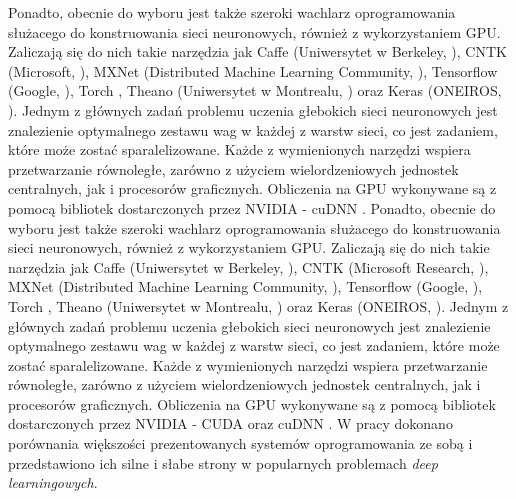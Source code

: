 \documentclass[12pt,a4paper,twoside]{article}
\begin{document}
Ponadto, obecnie do wyboru jest także szeroki wachlarz oprogramowania służacego do konstruowania sieci neuronowych, również z wykorzystaniem GPU. Zaliczają się do nich takie narzędzia jak Caffe (Uniwersytet w Berkeley, \citet{jia2014}), CNTK (Microsoft, \citet{yu2014}), MXNet (Distributed Machine Learning Community, \citet{chen2015}), Tensorflow (Google, \citet{abadi2016}), Torch \citep{collobert2011}, Theano (Uniwersytet w Montrealu, \citet{alrhou2016}) oraz Keras (ONEIROS, \citet{chollet2015}). Jednym z głównych zadań problemu uczenia głebokich sieci neuronowych jest znalezienie optymalnego zestawu wag w każdej z warstw sieci, co jest zadaniem, które może zostać sparalelizowane. Każde z wymienionych narzędzi wspiera przetwarzanie równoległe, zarówno z użyciem wielordzeniowych jednostek centralnych, jak i procesorów graficznych. Obliczenia na GPU wykonywane są z pomocą bibliotek dostarczonych przez NVIDIA - cuDNN \citep{chetlur2014}.
Ponadto, obecnie do wyboru jest także szeroki wachlarz oprogramowania służacego do konstruowania sieci neuronowych, również z wykorzystaniem GPU. Zaliczają się do nich takie narzędzia jak Caffe (Uniwersytet w Berkeley, \citet{jia2014}), CNTK (Microsoft Research, \citet{yu2014}), MXNet (Distributed Machine Learning Community, \citet{chen2015}), Tensorflow (Google, \citet{abadi2016}), Torch \citep{collobert2011}, Theano (Uniwersytet w Montrealu, \citet{alrfou2016}) oraz Keras (ONEIROS, \citet{chollet2015}). Jednym z głównych zadań problemu uczenia głebokich sieci neuronowych jest znalezienie optymalnego zestawu wag w każdej z warstw sieci, co jest zadaniem, które może zostać sparalelizowane. Każde z wymienionych narzędzi wspiera przetwarzanie równoległe, zarówno z użyciem wielordzeniowych jednostek centralnych, jak i procesorów graficznych.
Obliczenia na GPU wykonywane są z pomocą bibliotek dostarczonych przez NVIDIA - CUDA oraz cuDNN \citep{chetlur2014}.
W pracy \citet{shi2016} dokonano porównania większości prezentowanych systemów oprogramowania ze sobą i przedstawiono ich silne i słabe strony w popularnych problemach \textit{deep learningowych}.
\end{document}
